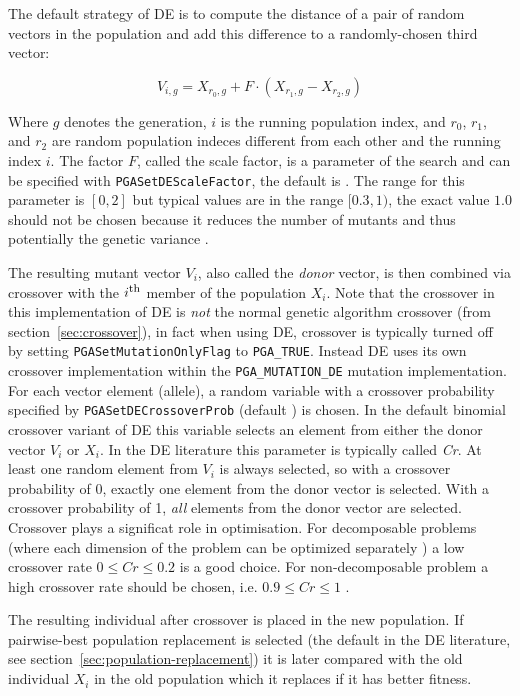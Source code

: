\documentclass{report}
\begin{document}
The default strategy of DE is to compute the distance of a pair of
random vectors in the population and add this difference to a
randomly-chosen third vector:

\begin{equation}\label{de/rand/1}
V_{i,g} = X_{r_0,g} + F \cdot (X_{r_1,g} - X_{r_2,g})
\end{equation}

Where $g$ denotes the generation, $i$ is the running population
index, and $r_0$, $r_1$, and $r_2$ are random population indeces
different from each other and the running index $i$. The factor $F$,
called the scale factor, is a parameter of the search and can be
specified with \verb+PGASetDEScaleFactor+, the default is
\DefaultDEScaleFactor. The range for this parameter is $[0,2]$ but
typical values are in the range $[0.3,1)$, the exact
value $1.0$ should not be chosen because it reduces the number of
mutants and thus potentially the genetic variance \cite[p.~75]{PSL05}.

The resulting
mutant vector $V_i$, also called the \textit{donor} vector, is then
combined via crossover with the $i^{\hbox{\footnotesize th}}$ member of
the population $X_i$. Note that the crossover in this implementation of DE is
\textit{not} the normal genetic algorithm crossover (from
section~\ref{sec:crossover}), in fact when using DE, crossover is
typically turned off by setting \verb+PGASetMutationOnlyFlag+ to
\verb+PGA_TRUE+. Instead DE uses its own crossover implementation
within the \verb+PGA_MUTATION_DE+ mutation implementation. For each
vector element (allele), a random variable with a crossover probability
specified by \verb+PGASetDECrossoverProb+ (default \DefaultDECrossoverProb)
is chosen. In the default binomial crossover variant of DE this variable
selects an element from either the donor vector $V_i$ or $X_i$. In the
DE literature this parameter is typically called \textit{Cr}. At least
one random element from $V_i$ is always selected, so with a crossover
probability of 0, exactly one element from the donor vector is selected.
With a crossover probability of 1, \textit{all} elements from the donor
vector are selected. Crossover plays a significat role in optimisation.
For decomposable problems (where each dimension of the problem can be
optimized separately \cite{Sal96}) a low crossover rate $0 \le Cr \le
0.2$ is a good choice. For non-decomposable problem a high crossover
rate should be chosen, i.e. $0.9 \le Cr \le 1$ \cite[p.~98]{PSL05}.

The resulting individual after crossover is placed in the
new population. If pairwise-best population replacement is selected (the
default in the DE literature, see section~\ref{sec:population-replacement})
it is later compared with the old individual $X_i$ in the old population
which it replaces if it has better fitness.
\end{document}

